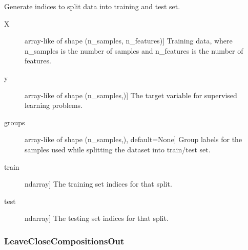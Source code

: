 \documentclass[letterpaper,10pt,english]{sphinxmanual}
\begin{document}
\begin{fulllineitems}

\begin{fulllineitems}
\label{\detokenize{api/mastml.data_splitters.JustEachGroup:mastml.data_splitters.JustEachGroup.split}}
Generate indices to split data into training and test set.
\begin{description}
\item[{X}] \leavevmode{[}array-like of shape (n\_samples, n\_features){]}
Training data, where n\_samples is the number of samples
and n\_features is the number of features.

\item[{y}] \leavevmode{[}array-like of shape (n\_samples,){]}
The target variable for supervised learning problems.

\item[{groups}] \leavevmode{[}array-like of shape (n\_samples,), default=None{]}
Group labels for the samples used while splitting the dataset into
train/test set.

\end{description}
\begin{description}
\item[{train}] \leavevmode{[}ndarray{]}
The training set indices for that split.

\item[{test}] \leavevmode{[}ndarray{]}
The testing set indices for that split.

\end{description}

\end{fulllineitems}


\end{fulllineitems}



\subsubsection{LeaveCloseCompositionsOut}
\label{\detokenize{api/mastml.data_splitters.LeaveCloseCompositionsOut:leaveclosecompositionsout}}\label{\detokenize{api/mastml.data_splitters.LeaveCloseCompositionsOut::doc}}
\end{document}
